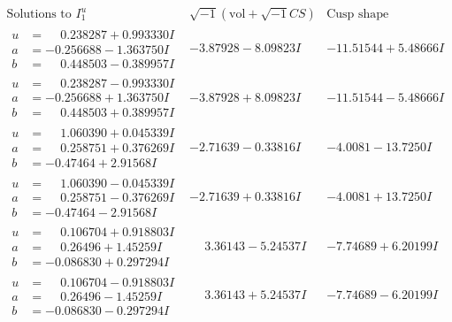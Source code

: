 \documentclass[1p]{elsarticle_modified}
\theoremstyle{definition}
\newcommand{\I}{\sqrt{-1}}
\begin{document}
$$\begin{array}{c|c|c}  
\text{Solutions to }I^u_{1}& \I (\text{vol} + \sqrt{-1}CS) & \text{Cusp shape}\\
 \hline 
\begin{aligned}
u &= \phantom{-}0.238287 + 0.993330 I \\
a &= -0.256688 - 1.363750 I \\
b &= \phantom{-}0.448503 - 0.389957 I\end{aligned}
 & -3.87928 - 8.09823 I & -11.51544 + 5.48666 I \\ \hline\begin{aligned}
u &= \phantom{-}0.238287 - 0.993330 I \\
a &= -0.256688 + 1.363750 I \\
b &= \phantom{-}0.448503 + 0.389957 I\end{aligned}
 & -3.87928 + 8.09823 I & -11.51544 - 5.48666 I \\ \hline\begin{aligned}
u &= \phantom{-}1.060390 + 0.045339 I \\
a &= \phantom{-}0.258751 + 0.376269 I \\
b &= -0.47464 + 2.91568 I\end{aligned}
 & -2.71639 - 0.33816 I & -4.0081 - 13.7250 I \\ \hline\begin{aligned}
u &= \phantom{-}1.060390 - 0.045339 I \\
a &= \phantom{-}0.258751 - 0.376269 I \\
b &= -0.47464 - 2.91568 I\end{aligned}
 & -2.71639 + 0.33816 I & -4.0081 + 13.7250 I \\ \hline\begin{aligned}
u &= \phantom{-}0.106704 + 0.918803 I \\
a &= \phantom{-}0.26496 + 1.45259 I \\
b &= -0.086830 + 0.297294 I\end{aligned}
 & \phantom{-}3.36143 - 5.24537 I & -7.74689 + 6.20199 I \\ \hline\begin{aligned}
u &= \phantom{-}0.106704 - 0.918803 I \\
a &= \phantom{-}0.26496 - 1.45259 I \\
b &= -0.086830 - 0.297294 I\end{aligned}
 & \phantom{-}3.36143 + 5.24537 I & -7.74689 - 6.20199 I \\ \hline\begin{aligned}

\end{aligned}
\end{array}$$
\end{document}
